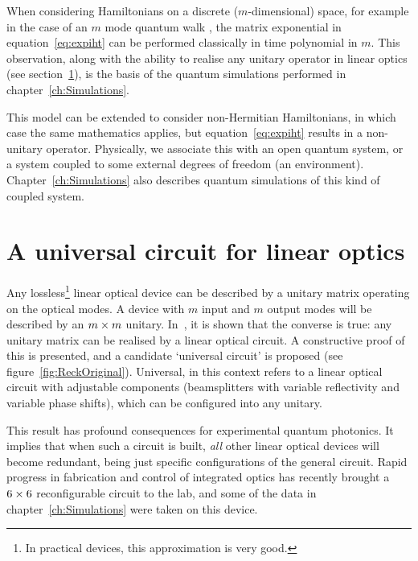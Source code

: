 When considering Hamiltonians on a discrete (\(m\)-dimensional) space, for
example in the case of an \(m\) mode quantum walk \cite{walks-peruzzo}, the
matrix exponential in equation~\ref{eq:expiht} can be performed classically in
time polynomial in \(m\). This observation, along with the ability to realise
any unitary operator in linear optics (see section~\ref{sec:ReckScheme}), is the
basis of the quantum simulations performed in chapter~\ref{ch:Simulations}.

This model can be extended to consider non-Hermitian Hamiltonians, in which
case the same mathematics applies, but equation~\ref{eq:expiht} results in a 
non-unitary operator. Physically, we associate this with an open quantum system,
or a system coupled to some external degrees of freedom (an environment).
Chapter~\ref{ch:Simulations} also describes quantum simulations of this kind of
coupled system.

\section{A universal circuit for linear optics}
\label{sec:ReckScheme}
Any lossless\footnote{In practical devices, this approximation is very good.
} linear optical device can be
described by a unitary matrix operating on the optical modes. A device with
\(m\) input and \(m\) output modes will be described by an \(m \times m\) unitary.
In~\cite{reck}, it is shown that the converse is true: any unitary matrix can
be realised by a linear optical circuit. A constructive proof of this is
presented, and a candidate `universal circuit' is proposed (see
figure~\ref{fig:ReckOriginal}). Universal, in this context refers to a linear
optical circuit with adjustable components (beamsplitters with variable
reflectivity and variable phase shifts), which can be configured into any
unitary.

This result has profound consequences for experimental quantum photonics.
It implies that when such a circuit is built, \emph{all} other linear optical
devices will become redundant, being just specific configurations of the
general circuit. Rapid progress in fabrication and control of integrated optics
has recently brought a \(6 \times 6\) reconfigurable circuit to the lab, and some
of the data in chapter~\ref{ch:Simulations} were taken on this device.


